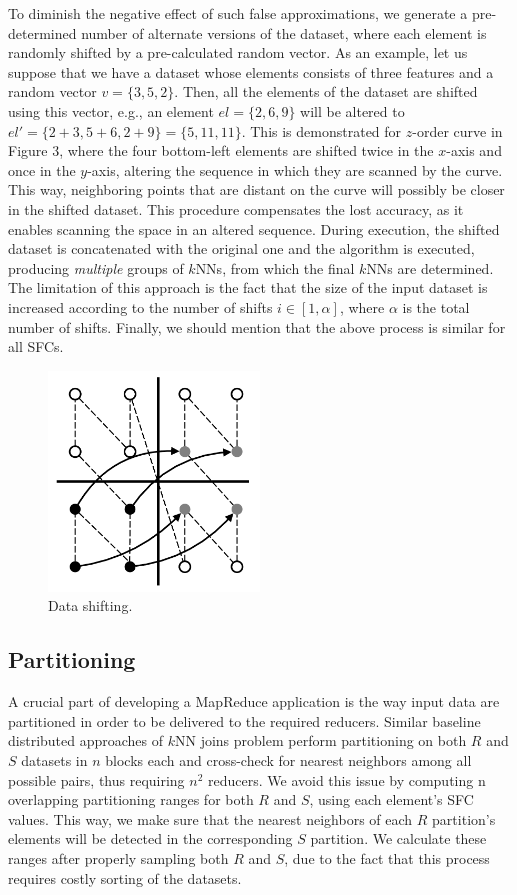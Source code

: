 To diminish the negative effect of such false approximations, we generate a pre-determined number of alternate versions of the dataset, where each element is randomly shifted by a pre-calculated random vector. As an example, let us suppose that we have a dataset whose elements consists of three features and a random vector $v=\{3, 5, 2\}$. Then, all the elements of the dataset are shifted using this vector, e.g., an element $el=\{2, 6, 9\}$ will be altered to $el'=\{2+3, 5+6, 2+9\}=\{5, 11, 11\}$. This is demonstrated for $z$-order curve in Figure 3, where the four bottom-left elements are shifted twice in the $x$-axis and once in the $y$-axis, altering the sequence in which they are scanned by the curve. This way, neighboring points that are distant on the curve will possibly be closer in the shifted dataset. This procedure compensates the lost accuracy, as it enables scanning the space in an altered sequence. During execution, the shifted dataset is concatenated with the original one and the algorithm is executed, producing \textit{multiple} groups of $k$NNs, from which the final $k$NNs are determined. The limitation of this approach is the fact that the size of the input dataset is increased according to the number of shifts $i\in{[1, \alpha]}$, where $\alpha$ is the total number of shifts. Finally, we should mention that the above process is similar for all SFCs.

\begin{figure}[!ht]
	\centering
	\includegraphics[width=0.5\textwidth]{figures/figure3.pdf}
	\caption{Data shifting.}
	\label{figure3}
\end{figure}

\subsection{Partitioning}
A crucial part of developing a MapReduce application is the way input data are partitioned in order to be delivered to the required reducers. Similar baseline distributed approaches of $k$NN joins problem perform partitioning on both $R$ and $S$ datasets in $n$ blocks each and cross-check for nearest neighbors among all possible pairs, thus requiring $n^2$ reducers. We avoid this issue by computing n overlapping partitioning ranges for both $R$ and $S$, using each element’s SFC values. This way, we make sure that the nearest neighbors of each $R$ partition’s elements will be detected in the corresponding $S$ partition. We calculate these ranges after properly sampling both $R$ and $S$, due to the fact that this process requires costly sorting of the datasets.

